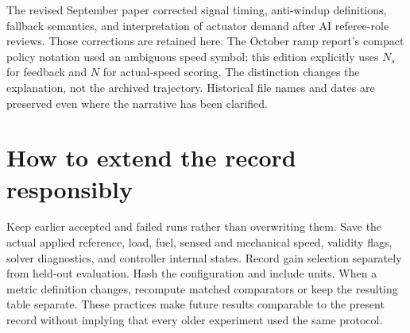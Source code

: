 The revised September paper corrected signal timing, anti-windup definitions, fallback semantics, and interpretation of actuator demand after AI referee-role reviews. Those corrections are retained here. The October ramp report's compact policy notation used an ambiguous speed symbol; this edition explicitly uses $N_s$ for feedback and $N$ for actual-speed scoring. The distinction changes the explanation, not the archived trajectory. Historical file names and dates are preserved even where the narrative has been clarified.

\section{How to extend the record responsibly}
Keep earlier accepted and failed runs rather than overwriting them. Save the actual applied reference, load, fuel, sensed and mechanical speed, validity flags, solver diagnostics, and controller internal states. Record gain selection separately from held-out evaluation. Hash the configuration and include units. When a metric definition changes, recompute matched comparators or keep the resulting table separate. These practices make future results comparable to the present record without implying that every older experiment used the same protocol.
